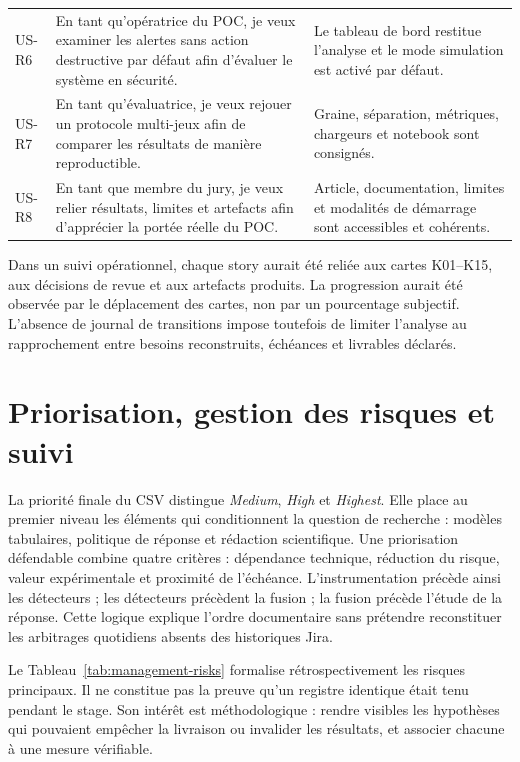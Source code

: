 \documentclass[11pt,a4paper,oneside]{report}
\theoremstyle{definition}
\theoremstyle{plain}
\begin{document}
\begin{longtable}{@{}p{}p{}p{}@{}}
US-R6 & En tant qu'opératrice du POC, je veux examiner les alertes sans action
destructive par défaut afin d'évaluer le système en sécurité. &
Le tableau de bord restitue l'analyse et le mode simulation est activé par défaut. \\
US-R7 & En tant qu'évaluatrice, je veux rejouer un protocole multi-jeux afin de
comparer les résultats de manière reproductible. &
Graine, séparation, métriques, chargeurs et notebook sont consignés. \\
US-R8 & En tant que membre du jury, je veux relier résultats, limites et
artefacts afin d'apprécier la portée réelle du POC. &
Article, documentation, limites et modalités de démarrage sont accessibles et cohérents. \\
\bottomrule
\end{longtable}

Dans un suivi opérationnel, chaque story aurait été reliée aux cartes K01--K15,
aux décisions de revue et aux artefacts produits. La progression aurait été
observée par le déplacement des cartes, non par un pourcentage subjectif.
L'absence de journal de transitions impose toutefois de limiter l'analyse au
rapprochement entre besoins reconstruits, échéances et livrables déclarés.

\section{Priorisation, gestion des risques et suivi}
\label{sec:management-risks}

La priorité finale du CSV distingue \emph{Medium}, \emph{High} et
\emph{Highest}. Elle place au premier niveau les éléments qui conditionnent la
question de recherche : modèles tabulaires, politique de réponse et rédaction
scientifique. Une priorisation défendable combine quatre critères : dépendance
technique, réduction du risque, valeur expérimentale et proximité de
l'échéance. L'instrumentation précède ainsi les détecteurs ; les détecteurs
précèdent la fusion ; la fusion précède l'étude de la réponse. Cette logique
explique l'ordre documentaire sans prétendre reconstituer les arbitrages
quotidiens absents des historiques Jira.

Le Tableau~\ref{tab:management-risks} formalise rétrospectivement les risques
principaux. Il ne constitue pas la preuve qu'un registre identique était tenu
pendant le stage. Son intérêt est méthodologique : rendre visibles les
hypothèses qui pouvaient empêcher la livraison ou invalider les résultats, et
associer chacune à une mesure vérifiable.
\end{document}
